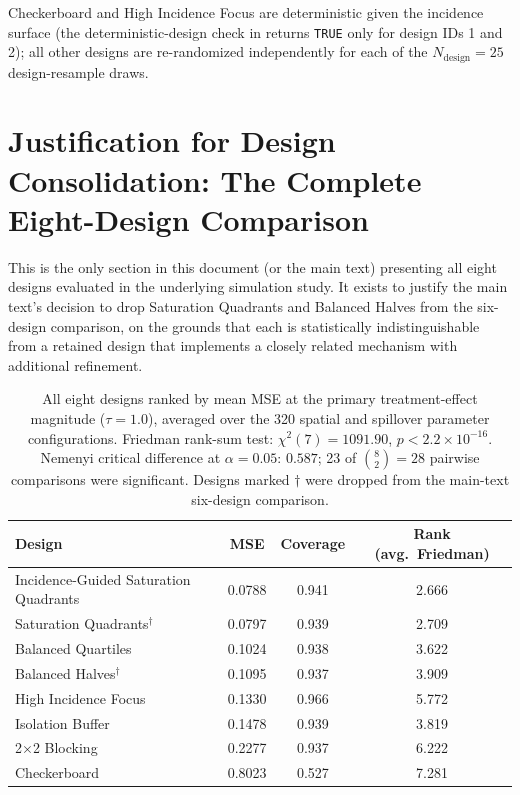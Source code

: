 \documentclass[11pt]{article}
\begin{document}
Checkerboard and High Incidence Focus are deterministic given the incidence
surface (the deterministic-design check in  returns
\texttt{TRUE} only for design IDs 1 and 2); all other designs are
re-randomized independently for each of the $N_{\text{design}}=25$
design-resample draws.

\section{Justification for Design Consolidation: The Complete Eight-Design Comparison}
\label{sec:s6}

This is the only section in this document (or the main text) presenting all
eight designs evaluated in the underlying simulation study. It exists to
justify the main text's decision to drop Saturation Quadrants and Balanced
Halves from the six-design comparison, on the grounds that each is
statistically indistinguishable from a retained design that implements a
closely related mechanism with additional refinement.

\begin{table}[h]
\centering
\caption{All eight designs ranked by mean MSE at the primary treatment-effect
magnitude ($\tau=1.0$), averaged over the 320 spatial and spillover parameter
configurations. Friedman rank-sum test: $\chi^2(7)=1091.90$,
$p<2.2\times10^{-16}$. Nemenyi critical difference at $\alpha=0.05$: $0.587$;
23 of $\binom{8}{2}=28$ pairwise comparisons were significant. Designs marked
$\dagger$ were dropped from the main-text six-design comparison.}
\label{tab:s6-eight-design}
\begin{tabular}{lccc}
\toprule
Design & MSE & Coverage & Rank (avg.\ Friedman) \\
\midrule
Incidence-Guided Saturation Quadrants & 0.0788 & 0.941 & 2.666 \\
Saturation Quadrants$^\dagger$        & 0.0797 & 0.939 & 2.709 \\
Balanced Quartiles                    & 0.1024 & 0.938 & 3.622 \\
Balanced Halves$^\dagger$             & 0.1095 & 0.937 & 3.909 \\
High Incidence Focus                  & 0.1330 & 0.966 & 5.772 \\
Isolation Buffer                      & 0.1478 & 0.939 & 3.819 \\
2$\times$2 Blocking                   & 0.2277 & 0.937 & 6.222 \\
Checkerboard                          & 0.8023 & 0.527 & 7.281 \\
\bottomrule
\end{tabular}
\end{table}
\end{document}
